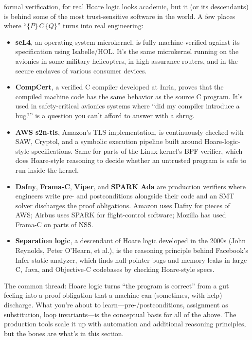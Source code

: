 \documentclass[11pt]{article}
\begin{document}
\begin{sidebar}{formal verification, for real}
Hoare logic looks academic, but it (or its descendants) is behind some of the most trust-sensitive software in the world. A few places where ``$\{P\}\, C\, \{Q\}$'' turns into real engineering:

\begin{itemize}
  \item \textbf{seL4}, an operating-system microkernel, is fully machine-verified against its specification using Isabelle/HOL. It's the same microkernel running on the avionics in some military helicopters, in high-assurance routers, and in the secure enclaves of various consumer devices.
  \item \textbf{CompCert}, a verified C compiler developed at Inria, proves that the compiled machine code has the same behavior as the source C program. It's used in safety-critical avionics systems where ``did my compiler introduce a bug?'' is a question you can't afford to answer with a shrug.
  \item \textbf{AWS s2n-tls}, Amazon's TLS implementation, is continuously checked with SAW, Cryptol, and a symbolic execution pipeline built around Hoare-logic-style specifications. Same for parts of the Linux kernel's BPF verifier, which does Hoare-style reasoning to decide whether an untrusted program is safe to run inside the kernel.
  \item \textbf{Dafny}, \textbf{Frama-C}, \textbf{Viper}, and \textbf{SPARK Ada} are production verifiers where engineers write pre- and postconditions alongside their code and an SMT solver discharges the proof obligations. Amazon uses Dafny for pieces of AWS; Airbus uses SPARK for flight-control software; Mozilla has used Frama-C on parts of NSS.
  \item \textbf{Separation logic}, a descendant of Hoare logic developed in the 2000s (John Reynolds, Peter O'Hearn, et al.), is the reasoning principle behind Facebook's Infer static analyzer, which finds null-pointer bugs and memory leaks in large C, Java, and Objective-C codebases by checking Hoare-style specs.
\end{itemize}

The common thread: Hoare logic turns ``the program is correct'' from a gut feeling into a proof obligation that a machine can (sometimes, with help) discharge. What you're about to learn---pre-/postconditions, assignment as substitution, loop invariants---is the conceptual basis for all of the above. The production tools scale it up with automation and additional reasoning principles, but the bones are what's in this section.
\end{sidebar}
\end{document}
